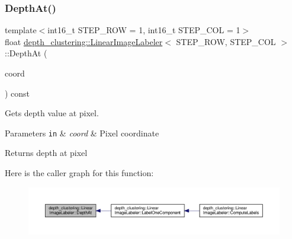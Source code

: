 \subsubsection{\texorpdfstring{Depth\+At()}{DepthAt()}}
{\footnotesize\ttfamily template$<$int16\+\_\+t S\+T\+E\+P\+\_\+\+R\+OW = 1, int16\+\_\+t S\+T\+E\+P\+\_\+\+C\+OL = 1$>$ \\
float \hyperlink{classdepth__clustering_1_1LinearImageLabeler}{depth\+\_\+clustering\+::\+Linear\+Image\+Labeler}$<$ S\+T\+E\+P\+\_\+\+R\+OW, S\+T\+E\+P\+\_\+\+C\+OL $>$\+::Depth\+At (\begin{DoxyParamCaption}\item[{const \hyperlink{structdepth__clustering_1_1PixelCoord}{Pixel\+Coord} \&}]{coord }\end{DoxyParamCaption}) const\hspace{0.3cm}{\ttfamily [inline]}}



Gets depth value at pixel. 


\begin{DoxyParams}[1]{Parameters}
\mbox{\tt in}  & {\em coord} & Pixel coordinate\\
\hline
\end{DoxyParams}
\begin{DoxyReturn}{Returns}
depth at pixel 
\end{DoxyReturn}
Here is the caller graph for this function\+:\nopagebreak
\begin{figure}[H]
\begin{center}
\leavevmode
\includegraphics[width=350pt]{classdepth__clustering_1_1LinearImageLabeler_abef293e252cf1afcac619f643f376921_icgraph}
\end{center}
\end{figure}
\mbox{\label{classdepth__clustering_1_1LinearImageLabeler_a4389f0085999f71cc283d6c378a2536a}} 
